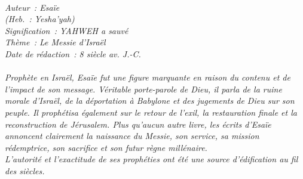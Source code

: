 \BFont
\noindent\hrulefill
{\footnotesize
\textit{
\bigskip
{\centering{}
\\Auteur~: Esaïe
\\(Heb.~: Yesha'yah)
\\Signification~: YAHWEH a sauvé
\\Thème~: Le Messie d'Israël
\\Date de rédaction~: 8 siècle av. J.-C.\\}
}
\textit{
\\Prophète en Israël, Esaïe fut une figure marquante en raison du contenu et de l'impact de son message. Véritable porte-parole de Dieu, il parla de la ruine morale d'Israël, de la déportation à Babylone et des jugements de Dieu sur son peuple. Il prophétisa également sur le retour de l'exil, la restauration finale et la reconstruction de Jérusalem. Plus qu'aucun autre livre, les écrits d'Esaïe annoncent clairement la naissance du Messie, son service, sa mission rédemptrice, son sacrifice et son futur règne millénaire. 
\\L'autorité et l'exactitude de ses prophéties ont été une source d'édification au fil des siècles.\bigskip
}
}
\par\nobreak\noindent\hrulefill
